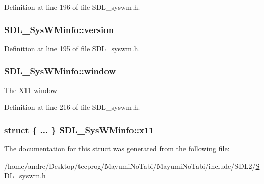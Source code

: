 Definition at line 196 of file S\-D\-L\-\_\-syswm.\-h.

\hypertarget{struct_s_d_l___sys_w_minfo_ac3a70af022d4849e9ff546595e94627f}{
\subsubsection[{version}]{ S\-D\-L\-\_\-\-Sys\-W\-Minfo\-::version}}\label{struct_s_d_l___sys_w_minfo_ac3a70af022d4849e9ff546595e94627f}


Definition at line 195 of file S\-D\-L\-\_\-syswm.\-h.

\hypertarget{struct_s_d_l___sys_w_minfo_a83ca4b0f4bdf67a0edee03d5bde86b93}{
\subsubsection[{window}]{ S\-D\-L\-\_\-\-Sys\-W\-Minfo\-::window}}\label{struct_s_d_l___sys_w_minfo_a83ca4b0f4bdf67a0edee03d5bde86b93}
The X11 window 

Definition at line 216 of file S\-D\-L\-\_\-syswm.\-h.

\hypertarget{struct_s_d_l___sys_w_minfo_a00ee462de755dce0807b5a9f8a2be12b}{
\subsubsection[{x11}]{\setlength{\rightskip}{0pt plus 5cm}struct \{ ... \}   S\-D\-L\-\_\-\-Sys\-W\-Minfo\-::x11}}\label{struct_s_d_l___sys_w_minfo_a00ee462de755dce0807b5a9f8a2be12b}


The documentation for this struct was generated from the following file\-:\begin{DoxyCompactItemize}
\item 
/home/andre/\-Desktop/tecprog/\-Mayumi\-No\-Tabi/\-Mayumi\-No\-Tabi/include/\-S\-D\-L2/\hyperlink{_s_d_l__syswm_8h}{S\-D\-L\-\_\-syswm.\-h}\end{DoxyCompactItemize}
